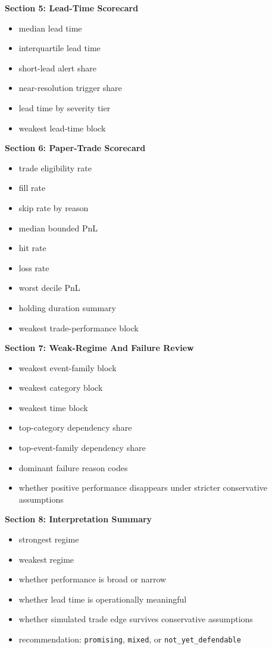 \documentclass{article}
\begin{document}
\textbf{Section 5: Lead-Time Scorecard}
\begin{itemize}
\item median lead time
\item interquartile lead time
\item short-lead alert share
\item near-resolution trigger share
\item lead time by severity tier
\item weakest lead-time block
\end{itemize}

\textbf{Section 6: Paper-Trade Scorecard}
\begin{itemize}
\item trade eligibility rate
\item fill rate
\item skip rate by reason
\item median bounded PnL
\item hit rate
\item loss rate
\item worst decile PnL
\item holding duration summary
\item weakest trade-performance block
\end{itemize}

\textbf{Section 7: Weak-Regime And Failure Review}
\begin{itemize}
\item weakest event-family block
\item weakest category block
\item weakest time block
\item top-category dependency share
\item top-event-family dependency share
\item dominant failure reason codes
\item whether positive performance disappears under stricter conservative assumptions
\end{itemize}

\textbf{Section 8: Interpretation Summary}
\begin{itemize}
\item strongest regime
\item weakest regime
\item whether performance is broad or narrow
\item whether lead time is operationally meaningful
\item whether simulated trade edge survives conservative assumptions
\item recommendation:
\texttt{promising},
\texttt{mixed},
or \texttt{not\_yet\_defendable}
\end{itemize}
\end{document}
